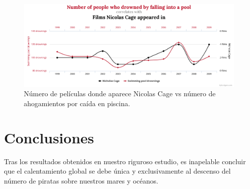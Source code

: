 \documentclass{article}
\begin{document}
\begin{figure}
  \includegraphics[width=\linewidth]{graph_2.png}
  \caption{Número de películas donde aparece Nicolas Cage vs número de ahogamientos por caída en piscina.}
  \label{fig:grafico_2}
\end{figure}




\section{Conclusiones}

Tras los resultados obtenidos en nuestro riguroso estudio, es inapelable concluir que el calentamiento global se debe única y exclusivamente al descenso del número de piratas sobre nuestros mares y océanos.

{}

\end{document}
